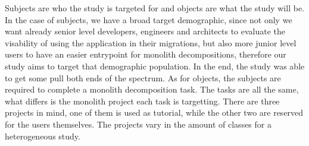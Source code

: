 Subjects are who the study is targeted for and objects are what the study will be. In the case of subjects, we have a broad target demographic, since not only we want already senior level developers, engineers and architects to evaluate the visability of using the application in their migrations, but also more junior level users to have an easier entrypoint for monolith decompositions, therefore our study aims to target that demographic population. In the end, the study was able to get some pull both ends of the spectrum.
As for objects, the subjects are required to complete a monolith decomposition task. The tasks are all the same, what differs is the monolith project each task is targetting. There are three projects in mind, one of them is used as tutorial, while the other two are reserved for the users themselves. The projects vary in the amount of classes for a heterogeneous study.
